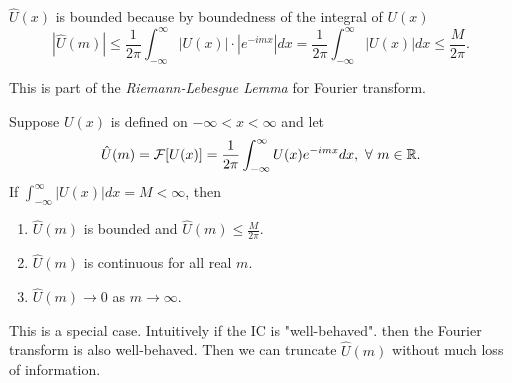 \documentclass[class=article,crop=false]{standalone}
\begin{document}
$ \hat{ U}(x)$ is bounded because by boundedness of the integral of $ U(x)$
\[
	|\hat{ U}(m)| \leq \frac{1}{2\pi} \int_{-\infty}^{\infty} |U(x)| \cdot |e^{-imx}| dx = \frac{1}{2\pi} \int_{-\infty}^{\infty} |U(x)|dx \leq \frac{M}{2\pi}  
.\] 

\begin{remark}
This is part of the \emph{Riemann-Lebesgue Lemma} for Fourier transform.  
\end{remark}

\begin{lem}
	Suppose $ U(x)$ is defined on  $ -\infty<x<\infty$ and let
	\[
		\hat{ U}(m) = \mathcal{F}[U(x)] = \frac{1}{2\pi} \int_{-\infty}^{\infty} U(x) e^{-imx} dx, \ \forall \ m \in \mathbb{R} 
	.\] 
	If $ \int_{-\infty}^{\infty} |U(x)| dx = M < \infty$, then
	\begin{enumerate}[label=\arabic*)]
		\item $ \hat{ U}(m)$ is bounded and $ \hat{ U}(m) \leq \frac{M}{2\pi}$.
		\item $ \hat{ U}(m)$ is continuous for all real $ m$.
		\item  $ \hat{ U}(m) \to 0$ as $ m \to \infty$.
	\end{enumerate}
\end{lem}
\begin{note}[]
	This is a special case. Intuitively if the IC is "well-behaved". then the Fourier transform is also well-behaved. Then we can truncate $ \hat{ U}(m)$ without much loss of information.
\end{note}
\end{document}
